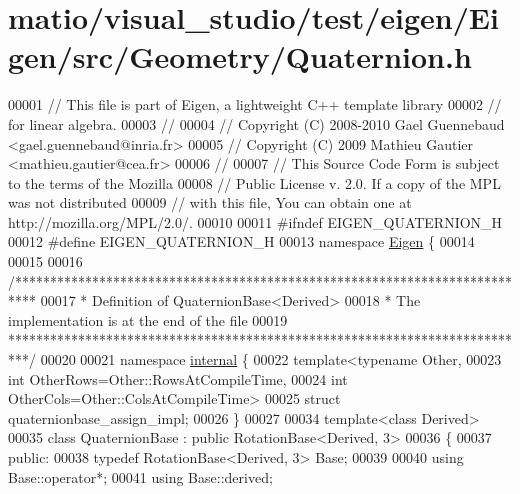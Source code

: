 \hypertarget{matio_2visual__studio_2test_2eigen_2_eigen_2src_2_geometry_2_quaternion_8h_source}{}\section{matio/visual\+\_\+studio/test/eigen/\+Eigen/src/\+Geometry/\+Quaternion.h}
\label{matio_2visual__studio_2test_2eigen_2_eigen_2src_2_geometry_2_quaternion_8h_source}

\begin{DoxyCode}
00001 \textcolor{comment}{// This file is part of Eigen, a lightweight C++ template library}
00002 \textcolor{comment}{// for linear algebra.}
00003 \textcolor{comment}{//}
00004 \textcolor{comment}{// Copyright (C) 2008-2010 Gael Guennebaud <gael.guennebaud@inria.fr>}
00005 \textcolor{comment}{// Copyright (C) 2009 Mathieu Gautier <mathieu.gautier@cea.fr>}
00006 \textcolor{comment}{//}
00007 \textcolor{comment}{// This Source Code Form is subject to the terms of the Mozilla}
00008 \textcolor{comment}{// Public License v. 2.0. If a copy of the MPL was not distributed}
00009 \textcolor{comment}{// with this file, You can obtain one at http://mozilla.org/MPL/2.0/.}
00010 
00011 \textcolor{preprocessor}{#ifndef EIGEN\_QUATERNION\_H}
00012 \textcolor{preprocessor}{#define EIGEN\_QUATERNION\_H}
00013 \textcolor{keyword}{namespace }\hyperlink{namespace_eigen}{Eigen} \{ 
00014 
00015 
00016 \textcolor{comment}{/***************************************************************************}
00017 \textcolor{comment}{* Definition of QuaternionBase<Derived>}
00018 \textcolor{comment}{* The implementation is at the end of the file}
00019 \textcolor{comment}{***************************************************************************/}
00020 
00021 \textcolor{keyword}{namespace }\hyperlink{namespaceinternal}{internal} \{
00022 \textcolor{keyword}{template}<\textcolor{keyword}{typename} Other,
00023          \textcolor{keywordtype}{int} OtherRows=Other::RowsAtCompileTime,
00024          \textcolor{keywordtype}{int} OtherCols=Other::ColsAtCompileTime>
00025 \textcolor{keyword}{struct }quaternionbase\_assign\_impl;
00026 \}
00027 
00034 \textcolor{keyword}{template}<\textcolor{keyword}{class} Derived>
00035 \textcolor{keyword}{class }QuaternionBase : \textcolor{keyword}{public} RotationBase<Derived, 3>
00036 \{
00037  \textcolor{keyword}{public}:
00038   \textcolor{keyword}{typedef} RotationBase<Derived, 3> Base;
00039 
00040   \textcolor{keyword}{using} Base::operator*;
00041   \textcolor{keyword}{using} Base::derived;

\end{DoxyCode}
